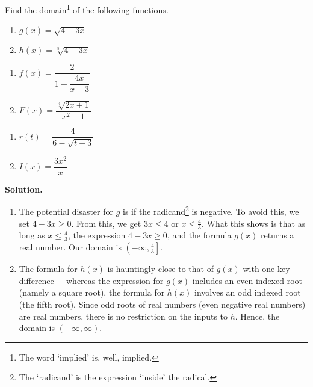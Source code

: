 \begin{ex}  Find the domain\footnote{The word `implied' is, well, implied.} of the following functions.

\begin{multicols}{2}
\begin{enumerate}

\item  $g(x) = \sqrt{4 - 3x}$
\item  $h(x) =  \sqrt[5]{4 - 3x}$

\setcounter{HW}{\value{enumi}}
\end{enumerate}
\end{multicols}

\begin{multicols}{2}
\begin{enumerate}
\setcounter{enumi}{\value{HW}}

\item  $f(x) = \dfrac{2}{1 - \dfrac{4x}{x-3}}$
\item  $F(x) = \dfrac{\sqrt[4]{2x+1}}{x^2-1}$ 

\setcounter{HW}{\value{enumi}}
\end{enumerate}
\end{multicols}

\begin{multicols}{2}
\begin{enumerate}
\setcounter{enumi}{\value{HW}}

\item  $r(t) = \dfrac{4}{6 - \sqrt{t+3}}$
\item  $I(x) = \dfrac{3x^2}{x}$ 

\end{enumerate}
\end{multicols}

{\bf Solution.}

\begin{enumerate}


\item  The potential disaster for $g$ is if the radicand\footnote{The `radicand' is the expression `inside' the radical.} is negative.  To avoid this, we set $4 - 3x \geq 0$. From this, we get $3x \leq 4$ or $x \leq \frac{4}{3}$.  What this shows is that as long as $x \leq \frac{4}{3}$, the expression $4 - 3x \geq 0$, and the formula $g(x)$ returns a real number.  Our domain is $\left(-\infty, \frac{4}{3}\right]$.

\item  The formula for $h(x)$ is hauntingly close to that of $g(x)$ with one key difference $-$ whereas the expression for $g(x)$ includes an even indexed root (namely a square root), the formula for $h(x)$ involves an odd indexed root (the fifth root).  Since odd roots of real numbers (even negative real numbers) are real numbers, there is no restriction on the inputs to $h$.  Hence, the domain is $(-\infty, \infty)$.



\end{enumerate}
\end{ex}

